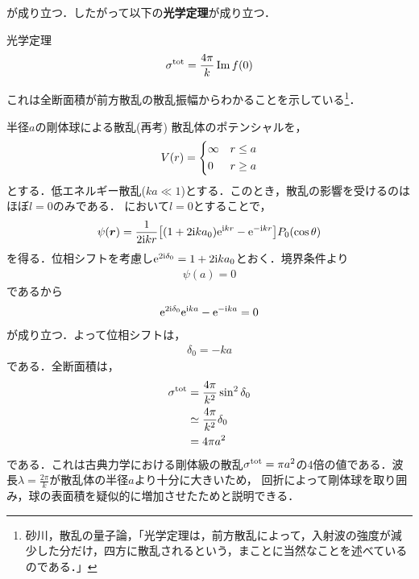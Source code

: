 \documentclass{report}
\begin{document}
  が成り立つ．したがって以下の\textbf{光学定理}が成り立つ．
  \begin{itembox}[l]{光学定理}
    \begin{align}
      \sigma^{\mathrm{tot}} = \frac{4\pi}{k} \Im f(0)
    \end{align}
  \end{itembox}
  これは全断面積が前方散乱の散乱振幅からわかることを示している\footnote{
    砂川，散乱の量子論，「光学定理は，前方散乱によって，入射波の強度が減少した分だけ，四方に散乱されるという，まことに当然なことを述べているのである．」 
  }．
  \begin{myex}{半径$a$の剛体球による散乱(再考)}{}
    散乱体のポテンシャルを，
    \begin{align}
      V(r) =
      \begin{dcases}
        \infty & r \leq a  \\
        0 & r \geq a
      \end{dcases}
    \end{align}
    とする．低エネルギー散乱($ka \ll 1$)とする．このとき，散乱の影響を受けるのはほぼ$l = 0$のみである．
    において$l = 0$とすることで，
    \begin{align}
      \psi(\bm{r}) = \frac{1}{2\mathrm{i} kr}\qty[(1 + 2\mathrm{i} k a_0)\mathrm{e}^{\mathrm{i} kr} - \mathrm{e}^{-\mathrm{i} kr}] P_0(\cos\theta)
    \end{align}
    を得る．位相シフトを考慮し$\mathrm{e}^{2\mathrm{i} \delta_0} = 1 + 2\mathrm{i} ka_0$とおく．境界条件より
    \begin{align}
      \psi(a) = 0
    \end{align}
    であるから
    \begin{align}
      \mathrm{e}^{2\mathrm{i} \delta_0}\mathrm{e}^{\mathrm{i} ka} - \mathrm{e}^{-\mathrm{i} ka} = 0
    \end{align}
    が成り立つ．よって位相シフトは，
    \begin{align}
      \delta_0 = -ka
    \end{align}
    である．全断面積は，
    \begin{align}
      \sigma^{\mathrm{tot}} &= \frac{4\pi}{k^2}\sin^2\delta_0 \\
      &\simeq \frac{4\pi}{k^2}\delta_0 \\
      &= 4\pi a^2
    \end{align}
    である．これは古典力学における剛体級の散乱$\sigma^{\mathrm{tot}}=\pi a^2$の4倍の値である．波長$\lambda=\frac{2\pi}{k}$が散乱体の半径$a$より十分に大きいため，
    回折によって剛体球を取り囲み，球の表面積を疑似的に増加させたためと説明できる．
  \end{myex}
\end{document}
